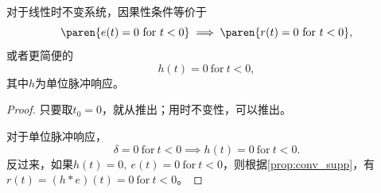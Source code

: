 \begin{proposition}
    对于线性时不变系统，因果性条件等价于
    \begin{equation}\label{eq:lti_causality_io}
        \paren{e(t)=0\ \mathrm{for}\ t<0}\implies \paren{r(t)=0\ \mathrm{for}\ t<0},
    \end{equation}
    或者更简便的
    \begin{equation}\label{eq:lti_causality_h}
        h(t)=0\ \mathrm{for}\ t<0,
    \end{equation}
    其中$h$为单位脉冲响应。
\end{proposition}
\begin{proof}
    只要取$t_0=0$，就从推出；用时不变性，可以推出。

    对于单位脉冲响应，
    \begin{equation}
        \delta=0\ \mathrm{for}\ t<0\implies h(t)=0\ \mathrm{for}\ t<0.
    \end{equation}
    反过来，如果$h(t)=0,\ e(t)=0\ \mathrm{for}\ t<0$，则根据\cref{prop:conv_supp}，有$r(t)=(h*e)(t)=0\ \mathrm{for}\ t<0$。
\end{proof}

